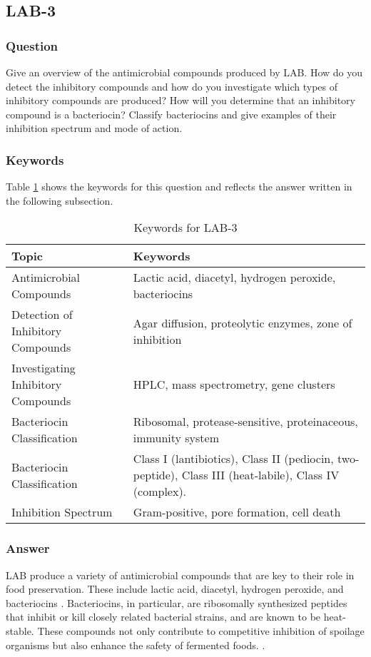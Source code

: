 \subsection{LAB-3}
\subsubsection*{Question}
Give an overview of the antimicrobial compounds produced by LAB. How do you detect the inhibitory compounds and how do you investigate which types of inhibitory compounds are produced? How will you determine that an inhibitory compound is a bacteriocin? Classify bacteriocins and give examples of their inhibition spectrum and mode of action. 

\subsubsection*{Keywords}
Table \ref{tab:KW-LAB3} shows the keywords for this question and reflects the answer written in the following subsection.
\begin{table}[h]
    \centering
    \caption{Keywords for LAB-3} 
    \label{tab:KW-LAB3}
    \begin{tabularx}{\textwidth}{l|X}
        \textbf{Topic} & \textbf{Keywords} \\
        \hline
        Antimicrobial Compounds & Lactic acid, diacetyl, hydrogen peroxide, bacteriocins \\

        Detection of Inhibitory Compounds & Agar diffusion, proteolytic enzymes, zone of inhibition \\

        Investigating Inhibitory Compounds & HPLC, mass spectrometry, gene clusters \\

        Bacteriocin Classification & Ribosomal, protease-sensitive, proteinaceous, immunity system \\

        Bacteriocin Classification &  Class I (lantibiotics), Class II (pediocin, two-peptide), Class III (heat-labile), Class IV (complex). \\

        Inhibition Spectrum & Gram-positive, pore formation, cell death \\
        \end{tabularx}
\end{table}

\subsubsection*{Answer}
LAB produce a variety of antimicrobial compounds that are key to their role in food preservation. These include lactic acid, diacetyl, hydrogen peroxide, and bacteriocins \cite*{L3-LAB}. Bacteriocins, in particular, are ribosomally synthesized peptides that inhibit or kill closely related bacterial strains, and are known to be heat-stable. These compounds not only contribute to competitive inhibition of spoilage organisms but also enhance the safety of fermented foods. \cite*{L3-LAB}.

